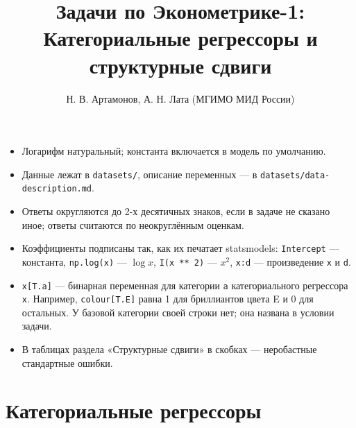 \documentclass[
  russian,
]{article}
\title{Задачи по Эконометрике-1: Категориальные регрессоры и структурные
сдвиги}
\author{Н. В. Артамонов, А. Н. Лата (МГИМО МИД России)}
\date{}
\providecommand{\tightlist}{%
  \setlength{\itemsep}{0pt}\setlength{\parskip}{0pt}}
\renewcommand*\contentsname{Содержание}
\newcommand\contentsname{Содержание}
\begin{document}
\maketitle

\renewcommand*\contentsname{Содержание}
{
\setcounter{tocdepth}{3}
\tableofcontents
}

\begin{tcolorbox}[enhanced jigsaw, arc=.35mm, bottomrule=.15mm, bottomtitle=1mm, breakable, colback=white, colbacktitle=quarto-callout-important-color!10!white, colframe=quarto-callout-important-color-frame, coltitle=black, left=2mm, leftrule=.75mm, opacityback=0, opacitybacktitle=0.6, rightrule=.15mm, title=\textcolor{quarto-callout-important-color}{\faExclamation}\hspace{0.5em}{Важно}, titlerule=0mm, toprule=.15mm, toptitle=1mm]

\begin{itemize}
\tightlist
\item
  Логарифм натуральный; константа включается в модель по умолчанию.
\item
  Данные лежат в \texttt{datasets/}, описание переменных --- в
  \texttt{datasets/data-description.md}.
\item
  Ответы округляются до 2-х десятичных знаков, если в задаче не сказано
  иное; ответы считаются по неокруглённым оценкам.
\item
  Коэффициенты подписаны так, как их печатает statsmodels:
  \texttt{Intercept} --- константа, \texttt{np.log(x)} --- \(\log x\),
  \texttt{I(x\ **\ 2)} --- \(x^2\), \texttt{x:d} --- произведение
  \texttt{x} и \texttt{d}.
\item
  \texttt{x{[}T.a{]}} --- бинарная переменная для категории \texttt{a}
  категориального регрессора \texttt{x}. Например,
  \texttt{colour{[}T.E{]}} равна 1 для бриллиантов цвета E и 0 для
  остальных. У базовой категории своей строки нет; она названа в условии
  задачи.
\item
  В таблицах раздела «Структурные сдвиги» в скобках --- неробастные
  стандартные ошибки.
\end{itemize}

\end{tcolorbox}

\section{Категориальные
регрессоры}\label{ux43aux430ux442ux435ux433ux43eux440ux438ux430ux43bux44cux43dux44bux435-ux440ux435ux433ux440ux435ux441ux441ux43eux440ux44b}
\end{document}
